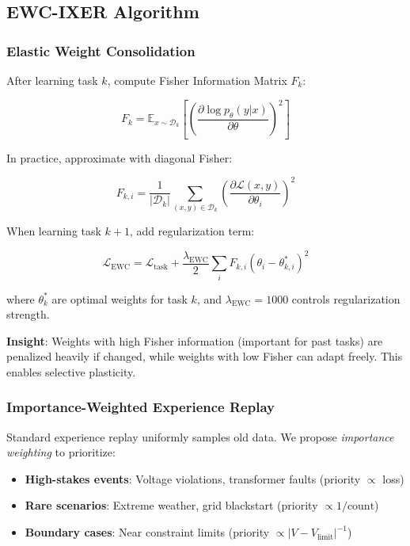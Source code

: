 \documentclass[journal]{IEEEtran}
\begin{document}
\subsection{EWC-IXER Algorithm}

\subsubsection{Elastic Weight Consolidation}

After learning task $k$, compute Fisher Information Matrix $F_k$:

\begin{equation}
F_k = \mathbb{E}_{x \sim \mathcal{D}_k} \left[ \left( \frac{\partial \log p_\theta(y | x)}{\partial \theta} \right)^2 \right]
\end{equation}

In practice, approximate with diagonal Fisher:

\begin{equation}
F_{k,i} = \frac{1}{|\mathcal{D}_k|} \sum_{(x,y) \in \mathcal{D}_k} \left( \frac{\partial \mathcal{L}(x,y)}{\partial \theta_i} \right)^2
\end{equation}

When learning task $k+1$, add regularization term:

\begin{equation}
\mathcal{L}_{\text{EWC}} = \mathcal{L}_{\text{task}} + \frac{\lambda_{\text{EWC}}}{2} \sum_{i} F_{k,i} (\theta_i - \theta^*_{k,i})^2
\end{equation}

where $\theta^*_k$ are optimal weights for task $k$, and $\lambda_{\text{EWC}} = 1000$ controls regularization strength.

\textbf{Insight}: Weights with high Fisher information (important for past tasks) are penalized heavily if changed, while weights with low Fisher can adapt freely. This enables selective plasticity.

\subsubsection{Importance-Weighted Experience Replay}

Standard experience replay uniformly samples old data. We propose \textit{importance weighting} to prioritize:
\begin{itemize}
    \item \textbf{High-stakes events}: Voltage violations, transformer faults (priority $\propto$ loss)
    \item \textbf{Rare scenarios}: Extreme weather, grid blackstart (priority $\propto 1/\text{count}$)
    \item \textbf{Boundary cases}: Near constraint limits (priority $\propto |V - V_{\text{limit}}|^{-1}$)
\end{itemize}
\end{document}
